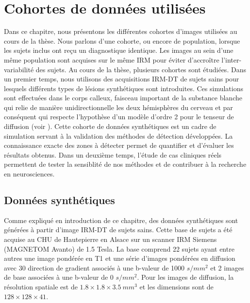 
\chapter{Cohortes de données utilisées}
\label{Chapter7} 

Dans ce chapitre, nous présentons les différentes cohortes d'images utilisées au cours de la thèse.
Nous parlons d'une cohorte, ou encore de population, lorsque les sujets inclus ont reçu un diagnostique identique.
Les images au sein d'une même population sont acquises sur le même IRM pour éviter d'accroître l'inter-variabilité des sujets.
Au cours de la thèse, plusieurs cohortes sont étudiées.
Dans un premier temps, nous utilisons des acquisitions IRM-DT de sujets sains 
pour lesquels différents types de lésions synthétiques sont introduites.
Ces simulations sont effectuées dans le corps calleux, faisceau important de la substance blanche 
qui relie de manière unidirectionnelle les deux hémisphères du cerveau 
et par conséquent qui respecte l'hypothèse d'un modèle d'ordre 2 pour le tenseur de diffusion (voir ).
Cette cohorte de données synthétiques est un cadre de simulation servant à la validation des méthodes de détection développées.
La connaissance exacte des zones à détecter permet de quantifier et d'évaluer les résultats obtenus.
Dans un deuxième temps, l'étude de cas cliniques réels permettent de tester la sensiblité de nos méthodes 
et de contribuer à la recherche en neurosciences.\\




\section{Données synthétiques}
Comme expliqué en introduction de ce chapitre, des données synthétiques sont générées à partir d'image IRM-DT de sujets sains.
Cette base de sujets a été acquise au CHU de Hautepierre en Alsace sur un scanner IRM Siemens (MAGNETOM Avanto) de 1.5 Tesla.
La base comprend 22 sujets ayant entre autres une image pondérée en T1 et une série d'images pondérées en diffusion avec 30 direction de gradient associés à une b-valeur de 1000 $s/mm^2$
et 2 images de base associées à une b-valeur de 0 $s/mm^2$.
Pour les images de diffusion, la résolution spatiale est de $1.8\times1.8\times3.5\ mm^3$ et les dimensions sont de $128\times128\times41$.

